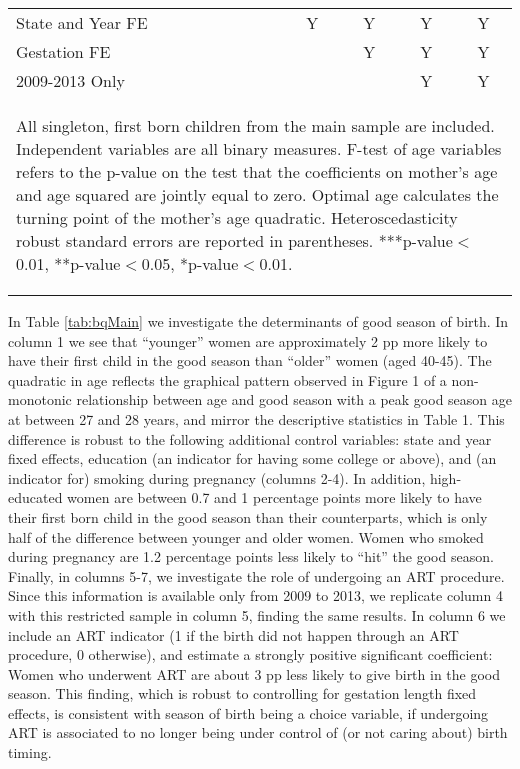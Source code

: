 \documentclass[a4paper, 11.5 pt]{article}
\theoremstyle{plain}
\begin{document}
\begin{doublespace}
\begin{table}[htbp]
\begin{tabular}{l*{5}{c}}
State and Year FE&&Y&Y&Y&Y\\ Gestation FE &&&Y&Y&Y\\
2009-2013 Only&&&&Y&Y\\ \bottomrule
\multicolumn{6}{p{16cm}}{\begin{footnotesize} All singleton,
first born children from the main sample are included. Independent
variables are all binary measures. F-test of age variables refers to the p-value on the test that               the coefficients on mother's age and age squared are jointly               equal to zero. Optimal age calculates the turning point of the mother's age               quadratic. Heteroscedasticity robust standard errors are reported in               parentheses.
***p-value$<$0.01, **p-value$<$0.05, *p-value$<$0.01.
\end{footnotesize}}\end{tabular}\end{table}



In Table \ref{tab:bqMain} we investigate the determinants of good season of birth. In column 1 we see that ``younger'' women are approximately 2 pp more likely to have their first child in the good season than ``older'' women (aged 40-45). The quadratic in age reflects the graphical pattern observed in Figure 1 of a non-monotonic relationship between age and good season with a peak good season age at between 27 and 28 years, and mirror the descriptive statistics in Table 1. This difference is robust to the following additional control variables: state and year fixed effects, education (an indicator for having some college or above), and (an indicator for) smoking during pregnancy (columns 2-4). In addition, high-educated women are between 0.7 and 1 percentage points more likely to have their first born child in the good season than their counterparts, which is only half of the difference between younger and older women. Women who smoked during pregnancy are 1.2 percentage points less likely to ``hit'' the good season. %
Finally, in columns 5-7, we investigate the role of undergoing an ART procedure. Since this information is available only from 2009 to 2013, we replicate column 4 with this restricted sample in column 5, finding the same results. In column 6 we include an ART indicator (1 if the birth did not happen through an ART procedure, 0 otherwise), and estimate a strongly positive significant coefficient: Women who underwent ART are about 3 pp less likely to give birth in the good season. This finding, which is robust to controlling for gestation length fixed effects, is consistent with season of birth being a choice variable, if undergoing ART is associated to no longer being under control of (or not caring about) birth timing.


\end{doublespace}
\end{document}
